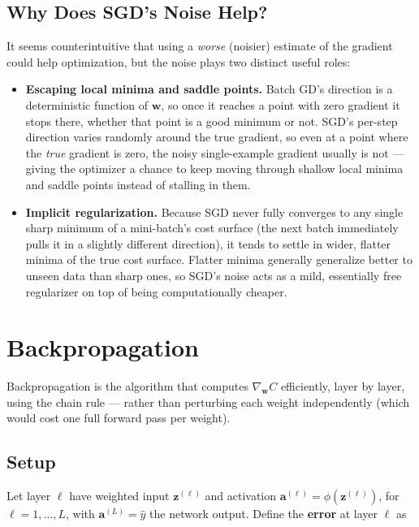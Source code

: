 \documentclass[11pt]{article}
\begin{document}
\subsection{Why Does SGD's Noise Help?}

It seems counterintuitive that using a \emph{worse} (noisier) estimate of
the gradient could help optimization, but the noise plays two distinct
useful roles:

\begin{itemize}
  \item \textbf{Escaping local minima and saddle points.} Batch GD's
        direction is a deterministic function of $\mathbf{w}$, so once it
        reaches a point with zero gradient it stops there, whether that
        point is a good minimum or not. SGD's per-step direction varies
        randomly around the true gradient, so even at a point where the
        \emph{true} gradient is zero, the noisy single-example gradient
        usually is not --- giving the optimizer a chance to keep moving
        through shallow local minima and saddle points instead of
        stalling in them.
  \item \textbf{Implicit regularization.} Because SGD never fully
        converges to any single sharp minimum of a mini-batch's cost
        surface (the next batch immediately pulls it in a slightly
        different direction), it tends to settle in wider, flatter
        minima of the true cost surface. Flatter minima generally
        generalize better to unseen data than sharp ones, so SGD's noise
        acts as a mild, essentially free regularizer on top of being
        computationally cheaper.
\end{itemize}

\section{Backpropagation}

Backpropagation is the algorithm that computes $\nabla_{\mathbf{w}} C$
efficiently, layer by layer, using the chain rule --- rather than
perturbing each weight independently (which would cost one full forward
pass per weight).

\subsection{Setup}

Let layer $\ell$ have weighted input $\mathbf{z}^{(\ell)}$ and activation
$\mathbf{a}^{(\ell)} = \phi(\mathbf{z}^{(\ell)})$, for $\ell = 1, \dots,
L$, with $\mathbf{a}^{(L)} = \hat{y}$ the network output. Define the
\textbf{error} at layer $\ell$ as
\end{document}
